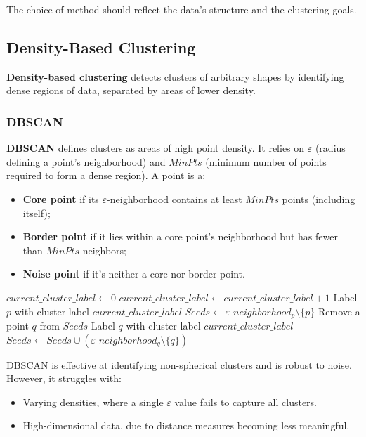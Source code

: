 The choice of method should reflect the data's structure and the clustering goals.


\subsection{Density-Based Clustering}
\textbf{Density-based clustering} detects clusters of arbitrary shapes by identifying dense regions of data, separated by areas of lower density.

\subsubsection{DBSCAN}
\textbf{DBSCAN} defines clusters as areas of high point density. It relies on $\varepsilon$ (radius defining a point's neighborhood) and $MinPts$ (minimum number of points required to form a dense region). A point is a:
\begin{itemize}
    \item \textbf{Core point} if its $\varepsilon$-neighborhood contains at least $MinPts$ points (including itself);
    \item \textbf{Border point} if it lies within a core point's neighborhood but has fewer than $MinPts$ neighbors;
    \item \textbf{Noise point} if it's neither a core nor border point.
\end{itemize}


\begin{algorithm}
\caption{DBSCAN Clustering Algorithm}
\begin{algorithmic}[1]
\State $current\_cluster\_label \gets 0$
        \State $current\_cluster\_label \gets current\_cluster\_label + 1$
        \State Label $p$ with cluster label $current\_cluster\_label$
        \State $Seeds \gets \varepsilon\text{-}neighborhood_p \setminus \{p\}$
            \State Remove a point $q$ from $Seeds$
                \State Label $q$ with cluster label $current\_cluster\_label$
                    \State $Seeds \gets Seeds \cup (\varepsilon\text{-}neighborhood_q \setminus \{q\})$
                \EndIf
            \EndIf
        \EndWhile
    \EndIf
\EndFor
\end{algorithmic}
\end{algorithm}


DBSCAN is effective at identifying non-spherical clusters and is robust to noise. However, it struggles with:
\begin{itemize}
    \item Varying densities, where a single $\varepsilon$ value fails to capture all clusters.
    \item High-dimensional data, due to distance measures becoming less meaningful.
\end{itemize}

